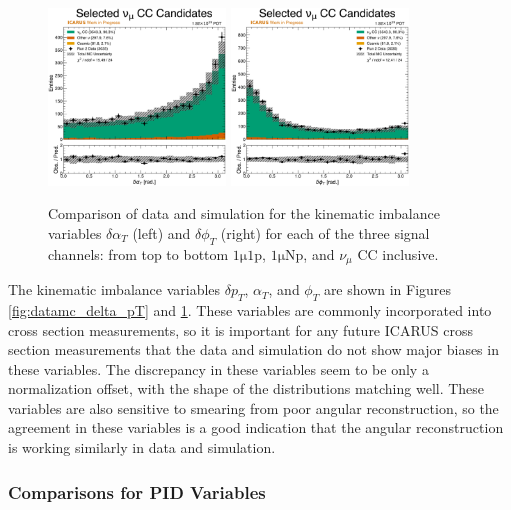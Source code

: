 \begin{figure}
    \\
    \includegraphics[width=0.42\textwidth]{figures/data_mc_comparisons/datamc_hist1d_1muX_delta_alphaT.pdf}
    \includegraphics[width=0.42\textwidth]{figures/data_mc_comparisons/datamc_hist1d_1muX_delta_phiT.pdf}
    \caption{Comparison of data and simulation for the kinematic imbalance variables $\delta \alpha_T$ (left) and $\delta \phi_T$ (right) for each of the three signal channels: from top to bottom $\mathrm{1\mu 1p}$, $\mathrm{1\mu Np}$, and $\nu_\mu$ CC inclusive.}
    \label{fig:datamc_kinematic_imbalance_angles}
\end{figure}

The kinematic imbalance variables $\delta p_T$, $\alpha_T$, and $\phi_T$ are shown in Figures \ref{fig:datamc_delta_pT} and \ref{fig:datamc_kinematic_imbalance_angles}. These variables are commonly incorporated into cross section measurements, so it is important for any future ICARUS cross section measurements that the data and simulation do not show major biases in these variables. The discrepancy in these variables seem to be only a normalization offset, with the shape of the distributions matching well. These variables are also sensitive to smearing from poor angular reconstruction, so the agreement in these variables is a good indication that the angular reconstruction is working similarly in data and simulation.

\subsubsection{Comparisons for PID Variables}
\label{sec:datamc_pid_variables}

